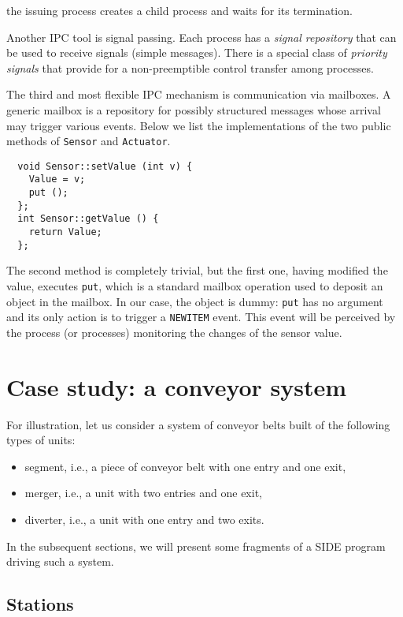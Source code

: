 \noindent
the issuing process creates a child process and waits for its termination.

Another IPC tool is signal passing.
Each process has a {\em signal repository\/} that can be used to receive
signals (simple messages).
There is a special class of {\em priority signals\/} that provide for a
non-preemptible control transfer among processes.

The third and most flexible IPC mechanism is communication via mailboxes.
A generic mailbox is a repository for possibly structured messages whose
arrival may trigger various events.
Below we list the implementations of the two public methods of
{\tt Sensor} and {\tt Actuator}.

{\small\begin{verbatim}
  void Sensor::setValue (int v) {
    Value = v;
    put ();
  };
  int Sensor::getValue () {
    return Value;
  };
\end{verbatim}}

The second method is completely trivial, but the first one, having modified the
value, executes {\tt put},
which is a standard mailbox operation used to deposit
an object in the mailbox.
In our case, the object is dummy: {\tt put} has no argument and its only
action is to trigger a {\tt NEWITEM} event.
This event will be perceived by the process (or processes)
monitoring the changes of the sensor value.

\section{Case study: a conveyor system}

For illustration, let us consider a system of conveyor belts
built of the following types of units:

\begin{itemize}
\item
segment, i.e., a piece of conveyor belt with one entry and one exit,
\item
merger, i.e., a unit with two entries and one exit,
\item
diverter, i.e., a unit with one entry and two exits.
\end{itemize}

In the subsequent sections, we will present some fragments of
a SIDE program driving such a system.

\subsection{Stations}

